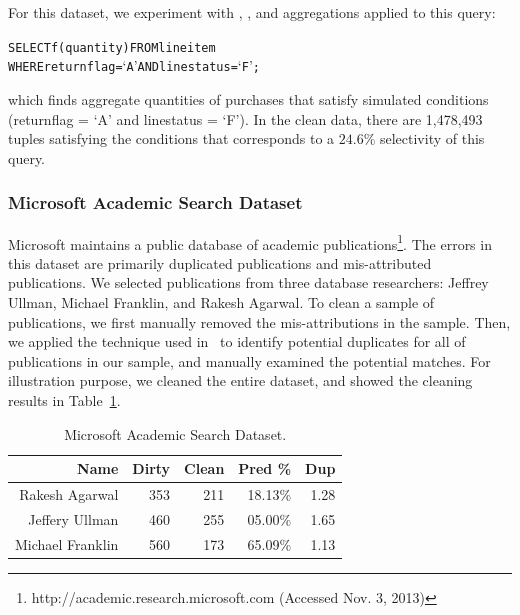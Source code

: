 For this dataset, we experiment with \avgfunc, \countfunc, and \sumfunc aggregations applied to this query:
\begin{alltt}
SELECT f(quantity) FROM lineitem
WHERE returnflag = `A' AND linestatus = `F';
\end{alltt}
which finds aggregate quantities of purchases that satisfy simulated conditions (returnflag = `A' and linestatus = `F').
In the clean data, there are 1,478,493 tuples satisfying the conditions that corresponds to a $24.6\%$ selectivity of this query.

\subsubsection{Microsoft Academic Search Dataset}
Microsoft maintains a public database of academic publications\footnote{\scriptsize http://academic.research.microsoft.com (Accessed Nov. 3, 2013)}.
The errors in this dataset are primarily duplicated publications and mis-attributed publications.
We selected publications from three database researchers: Jeffrey Ullman, Michael Franklin, and Rakesh Agarwal.
To clean a sample of publications, we first manually removed the mis-attributions in the sample. Then, we applied the technique used in~\cite{DBLP:journals/pvldb/WangKFF12} to identify potential duplicates for all of publications in our sample, and manually examined the potential matches.  
For illustration purpose, we cleaned the entire dataset, and showed the cleaning results in Table~\ref{tbl:dataset:ms-academic}. 
\begin{table}[!ht]\vspace{-1em}
\centering\caption{Microsoft Academic Search Dataset.}\vspace{.5em} \label{tbl:dataset:ms-academic}
\begin{tabular}{r r r r r}
\hline\hline
Name & Dirty & Clean & Pred \% & Dup \\ 
\hline  %
Rakesh Agarwal & 353 & 211 & 18.13\% & 1.28\\
\hline
Jeffery Ullman & 460 & 255 & 05.00\% & 1.65\\
\hline
Michael Franklin & 560 & 173 & 65.09\% & 1.13\\
\hline
\end{tabular}\vspace{-.75em}
\end{table}

